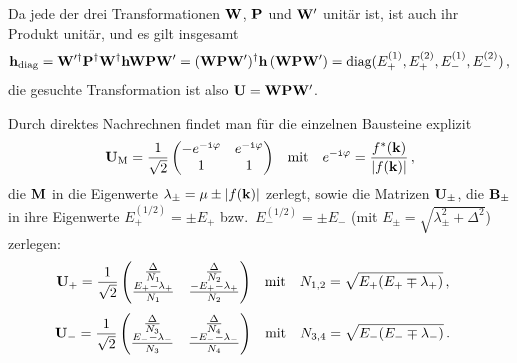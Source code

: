 Da jede der drei Transformationen $\mathbf{W}$, $\mathbf{P}$ und $\mathbf{W}'$ unitär ist, ist auch ihr Produkt unitär, und es gilt insgesamt
\begin{align}
    \mathbf{h}_{\text{diag}} = \mathbf{W}'^\dagger \mathbf{P}^\dagger \mathbf{W}^\dagger \mathbf{h} \mathbf{W} \mathbf{P} \mathbf{W}' = (\mathbf{W} \mathbf{P} \mathbf{W}')^\dagger \mathbf{h} \, (\mathbf{W} \mathbf{P} \mathbf{W}') = \text{diag}(E_+^{(1)}, E_+^{(2)}, E_-^{(1)}, E_-^{(2)}) \, ,
\end{align}
die gesuchte Transformation ist also $\mathbf{U} = \mathbf{W} \mathbf{P} \mathbf{W}'$.

Durch direktes Nachrechnen findet man für die einzelnen Bausteine explizit
\begin{align}
    \mathbf{U}_\text{M} &= \frac{1}{\sqrt{2}}\begin{pmatrix}
        -e^{-\texttt{i} \varphi} & e^{-\texttt{i} \varphi} \\ 1 & 1
    \end{pmatrix} & \text{mit} & & e^{-\texttt{i} \varphi} = \frac{f^*(\mathbf{k})}{\abs{f(\mathbf{k})}} \, ,
\end{align}
die $\mathbf{M}$ in die Eigenwerte $\lambda_\pm = \mu \pm \abs{f(\mathbf{k})}$ zerlegt, 
sowie die Matrizen $\mathbf{U}_\pm$, die $\mathbf{B}_\pm$ in ihre Eigenwerte $E_{+}^{(1/2)} = \pm E_+$ bzw.\ $E_-^{(1/2)} = \pm E_-$ (mit $E_\pm = \sqrt{\lambda_\pm^2 + \Delta^2}$) zerlegen:
\begin{align}
    \mathbf{U}_+ &= \frac{1}{\sqrt{2}}\begin{pmatrix}
        \frac{\Delta}{N_1} & \frac{\Delta}{N_2} \\
        \frac{E_+ - \lambda_+}{N_1} & \frac{-E_+ - \lambda_+}{N_2}
    \end{pmatrix} & \text{mit} & & N_{1,2} &= \sqrt{E_+(E_+ \mp \lambda_+)} \, ,
\end{align}
\begin{align}
    \mathbf{U}_- &= \frac{1}{\sqrt{2}}\begin{pmatrix}
        \frac{\Delta}{N_3} & \frac{\Delta}{N_4} \\
        \frac{E_- - \lambda_-}{N_3} & \frac{-E_- - \lambda_-}{N_4}
    \end{pmatrix} & \text{mit} & & N_{3,4} &= \sqrt{E_-(E_- \mp \lambda_-)} \, .
\end{align}

